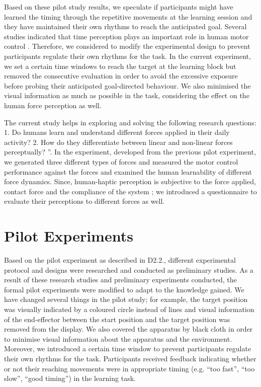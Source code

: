 Based on these pilot study results, we speculate if participants might have learned the timing through the repetitive movements at the learning session and they have maintained their own rhythms to reach the anticipated goal. Several studies indicated that time perception plays an important role in human motor control \cite{Berret2016, Goodbody1998, Rank2015}. Therefore, we considered to modify the experimental design to prevent participants regulate their own rhythms for the task. In the current experiment, we set a certain time windows to reach the target at the learning block but removed the consecutive evaluation in order to avoid the excessive exposure before probing their anticipated goal-directed behaviour. We also minimised the visual information as much as possible in the task, considering the effect on the human force perception as well.

The current study helps in exploring and solving the following research questions: 1. Do humans learn and understand different forces applied in their daily activity? 2. How do they differentiate between linear and non-linear forces perceptually? ”. In the experiment, developed from the previous pilot experiment, we generated three different types of forces and measured the motor control performance against the forces and examined the human learnability of different force dynamics. Since, human-haptic perception is subjective to the force applied, contact force and the compliance of the system \cite{van2014}; we introduced a questionnaire to evaluate their perceptions to different forces as well. 

\section{Pilot Experiments}
Based on the pilot experiment as described in D2.2., different experimental protocol and designs were researched and conducted as preliminary studies. As a result of these research studies and preliminary experiments conducted, the formal pilot experiments were modified to adapt to the knowledge gained. We have changed several things in the pilot study; for example, the target position was visually indicated by a coloured circle instead of lines and visual information of the end-effector between the start position and the target position was removed from the display. We also covered the apparatus by black cloth in order to minimise visual information about the apparatus and the environment. Moreover, we introduced a certain time window to prevent participants regulate their own rhythms for the task. Participants received feedback indicating whether or not their reaching movements were in appropriate timing (e.g. “too fast”, “too slow”, “good timing”) in the learning task.


